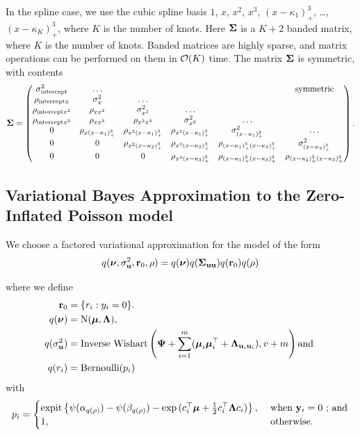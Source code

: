 In the spline case, we use the cubic spline basis $1$, $x$, $x^2$, $x^3$, $(x -
\kappa_1)^3_+$, \ldots, $(x - \kappa_K)^3_+$, where $K$ is the number of knots.
Here ${\boldsymbol \Sigma}$ is a $K + 2$ banded matrix, where $K$ is the number of knots.
Banded matrices are highly sparse, and matrix operations can be performed on
them in $\mathcal{O}(K)$ time. The matrix ${\boldsymbol \Sigma}$ is symmetric, with contents
\[
	{\boldsymbol \Sigma} =
	\begin{pmatrix}
		\sigma^2_{\text{intercept}} & \ldots                      &                             &                               &                                          & \text{symmetric}              \\
		\rho_{\text{intercept} x} & \sigma^2_x & \ldots\\
		\rho_{\text{intercept} x^2} & \rho_{x x^2} & \sigma^2_{x^2} & \ldots \\
		\rho_{\text{intercept} x^3} & \rho_{x x^3} & \rho_{x^2 x^3} & \sigma^2_{x^3} & \ldots \\
		0                           & \rho_{x (x - \kappa_1)^3_+} & \rho_{x^2 (x-\kappa_1)_+^3} & \rho_{x^3 (x - \kappa_1)_+^3} & \sigma^2_{(x - \kappa_1)_+^3}            & \ldots                        \\
		0                           & 0                           & \rho_{x^2 (x-\kappa_2)_+^3} & \rho_{x^3 (x-\kappa_2)_+^3}   & \rho_{(x-\kappa_1)_+^3 (x-\kappa_2)_+^3} & \sigma^2_{(x - \kappa_2)_+^3} \\
		0 & 0 & 0 & \rho_{x^3 (x - \kappa_3)_+^3} & \rho_{(x - \kappa_1)_+^3 (x - \kappa_3)_+^3} & \rho_{(x - \kappa_2)_+^3 (x - \kappa_3)_+^3}
	\end{pmatrix}.
\]

\subsection{Variational Bayes Approximation to the Zero-Inflated Poisson model}
We choose a factored variational approximation for the model of the form 
\[
	q({\boldsymbol \nu}, \sigma_{{\bf u}}^2,{\bf r}_0, \rho) = q({\boldsymbol \nu}) q({\boldsymbol \Sigma}_{{\bf u} {\bf u}}) q({\bf r}_0) q(\rho)
\]

\noindent where we define 
\begin{align*}
    {\bf r}_0 &= \{ r_i : y_i = 0 \}. \\
    q({\boldsymbol \nu}) &= \text{N}({\boldsymbol \mu}, {\boldsymbol \Lambda}), \\ 
    q(\sigma_{{\bf u}}^2) &= \text{Inverse Wishart}\left({\boldsymbol \Psi} + \sum_{i=1}^m ({\boldsymbol \mu}_i {\boldsymbol \mu}_i^\top + {\boldsymbol \Lambda}_{{\bf u}_i {\bf u}_i}), v + m \right) \mbox{and } \\ 
    q(r_i) &= \text{Bernoulli}{(p_i)} 
\end{align*}
with
$$p_i = 
\begin{cases}
\text{expit}\left\{ \psi{(\alpha_{q(\rho)})} - \psi{(\beta_{q(\rho)})} - \exp{(c_i^\top{\boldsymbol\mu}+ \frac{1}{2} c_i^\top {\boldsymbol\Lambda}c_i)} \right\},& \text{ when } {\bf y}_i = 0\text{ ; and}\\
1,& \text{ otherwise.}
\end{cases}$$

